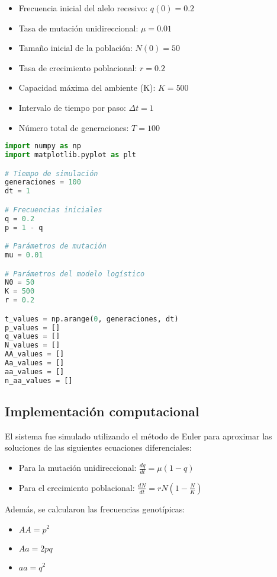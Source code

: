 \documentclass[12pt]{article}
\begin{document}
\begin{itemize}
    \item Frecuencia inicial del alelo recesivo: $q(0) = 0.2$
    \item Tasa de mutación unidireccional: $\mu = 0.01$
    \item Tamaño inicial de la población: $N(0) = 50$
    \item Tasa de crecimiento poblacional: $r = 0.2$
    \item Capacidad máxima del ambiente (K): $K = 500$
    \item Intervalo de tiempo por paso: $\Delta t = 1$
    \item Número total de generaciones: $T = 100$
\end{itemize}
\begin{lstlisting}[language=Python, caption=Simulación de evolución genética con mutación unidireccional: Parámetros iniciales]
import numpy as np
import matplotlib.pyplot as plt

# Tiempo de simulación
generaciones = 100
dt = 1

# Frecuencias iniciales
q = 0.2
p = 1 - q

# Parámetros de mutación
mu = 0.01

# Parámetros del modelo logístico
N0 = 50
K = 500
r = 0.2

t_values = np.arange(0, generaciones, dt)
p_values = []
q_values = []
N_values = []
AA_values = []
Aa_values = []
aa_values = []
n_aa_values = []
\end{lstlisting}

\subsection*{Implementación computacional}

El sistema fue simulado utilizando el método de Euler para aproximar las soluciones de las siguientes ecuaciones diferenciales:

\begin{itemize}
    \item Para la mutación unidireccional: \(\displaystyle \frac{dq}{dt} = \mu (1 - q)\)
    \item Para el crecimiento poblacional: \(\displaystyle \frac{dN}{dt} = rN\left(1 - \frac{N}{K}\right)\)
\end{itemize}

Además, se calcularon las frecuencias genotípicas:
\begin{itemize}
    \item $AA = p^2$
    \item $Aa = 2pq$
    \item $aa = q^2$
\end{itemize}
\end{document}
